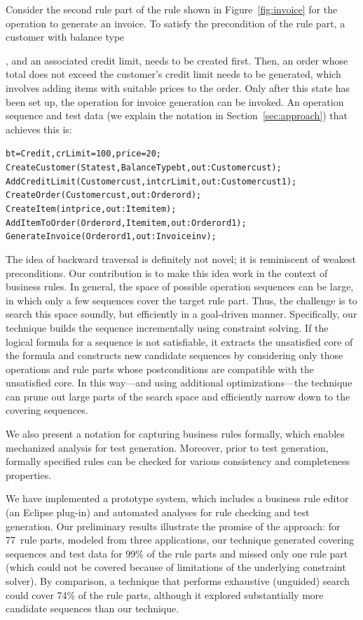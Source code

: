 Consider the second rule part of the rule shown in Figure~\ref{fig:invoice} for
the operation to generate an invoice. To satisfy the precondition of the rule
part, a customer with balance type \subject{Credit}, and an associated credit
limit, needs to be created first. Then, an order whose total does not exceed the
customer's credit limit needs to be generated, which involves adding items with
suitable prices to the order. Only after this state has been set up, the
operation for invoice generation can be invoked. An operation sequence and test
data (we explain the notation in Section~\ref{sec:approach}) that achieves this
is:

\vspace*{-4pt}
{\scriptsize
\begin{alltt}
 bt = Credit, crLimit = 100, price = 20;
 CreateCustomer(State st, BalanceType bt, out: Customer cust);
 AddCreditLimit(Customer cust, int crLimit, out: Customer cust1);
 CreateOrder(Customer cust, out: Order ord);
 CreateItem(int price, out: Item item);
 AddItemToOrder(Order ord, Item item, out: Order ord1);
 GenerateInvoice(Order ord1, out: Invoice inv);  
\end{alltt}
}
\vspace*{-5pt}

The idea of backward traversal is definitely not novel; it is reminiscent of
weakest preconditions.  Our contribution is to make this idea work in the
context of business rules.  In general, the space of possible operation
sequences can be large, in which only a few sequences cover the target rule
part. Thus, the challenge is to search this space soundly, but efficiently in a
goal-driven manner. Specifically, our technique builds the sequence
incrementally using constraint solving. If the logical formula for a sequence is
not satisfiable, it extracts the unsatisfied core of the formula and constructs
new candidate sequences by considering only those operations and rule parts
whose postconditions are compatible with the unsatisfied core. In this way---and
using additional optimizations---the technique can prune out large parts of the
search space and efficiently narrow down to the covering sequences.

We also present a notation for capturing business rules formally, which enables
mechanized analysis for test generation. Moreover, prior to test generation,
formally specified rules can be checked for various consistency and completeness
properties.

We have implemented a prototype system, which includes a business rule editor
(an Eclipse plug-in) and automated analyses for rule checking and test
generation. Our preliminary results illustrate the promise of the approach: for
77~rule parts, modeled from three applications, our technique generated covering
sequences and test data for 99\% of the rule parts and missed only one rule part
(which could not be covered because of limitations of the underlying constraint
solver). By comparison, a technique that performs exhaustive (unguided) search
could cover 74\% of the rule parts, although it explored substantially more
candidate sequences than our technique.
